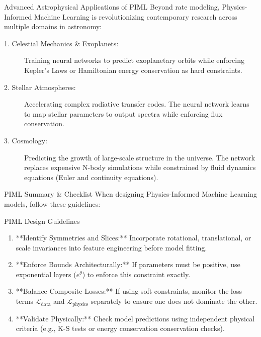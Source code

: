 \documentclass[9pt]{beamer}
\begin{document}
\begin{frame}{Advanced Astrophysical Applications of PIML}
  Beyond rate modeling, Physics-Informed Machine Learning is revolutionizing contemporary research across multiple domains in astronomy:
  \begin{description}
    \item[1. Celestial Mechanics \& Exoplanets:]
      Training neural networks to predict exoplanetary orbits while enforcing Kepler's Laws or Hamiltonian energy conservation as hard constraints.
    \item[2. Stellar Atmospheres:]
      Accelerating complex radiative transfer codes. The neural network learns to map stellar parameters to output spectra while enforcing flux conservation.
    \item[3. Cosmology:]
      Predicting the growth of large-scale structure in the universe. The network replaces expensive N-body simulations while constrained by fluid dynamics equations (Euler and continuity equations).
  \end{description}
\end{frame}

\begin{frame}{PIML Summary \& Checklist}
  When designing Physics-Informed Machine Learning models, follow these guidelines:
  \begin{block}{PIML Design Guidelines}
    \begin{enumerate}
      \item **Identify Symmetries and Slices:** Incorporate rotational, translational, or scale invariances into feature engineering before model fitting.
      \item **Enforce Bounds Architecturally:** If parameters must be positive, use exponential layers ($e^{\theta}$) to enforce this constraint exactly.
      \item **Balance Composite Losses:** If using soft constraints, monitor the loss terms $\mathcal{L}_{\text{data}}$ and $\mathcal{L}_{\text{physics}}$ separately to ensure one does not dominate the other.
      \item **Validate Physically:** Check model predictions using independent physical criteria (e.g., K-S tests or energy conservation conservation checks).
    \end{enumerate}
  \end{block}
\end{frame}
\end{document}
